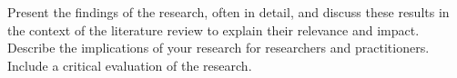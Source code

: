 Present the findings of the research, often in detail,
and discuss these results in the context of the literature review
to explain their relevance and impact.
Describe the implications of your research for researchers and practitioners.
Include a critical evaluation of the research.
